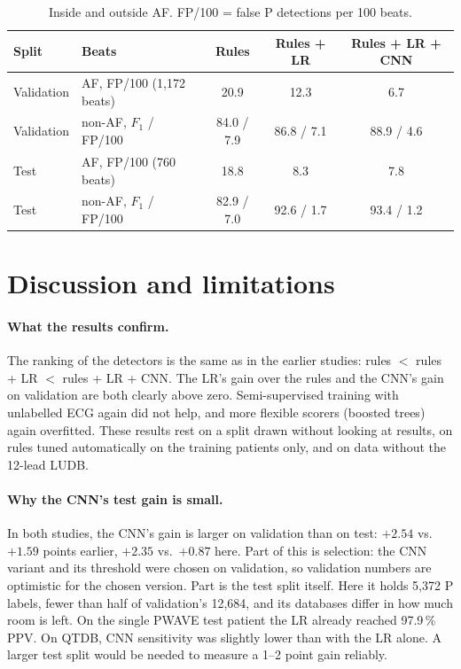 \documentclass[11pt,a4paper]{article}
\begin{document}
\begin{table}[ht]
\centering
\caption{Inside and outside AF. FP/100 = false P detections per 100 beats.}
\label{tab:af}
\begin{tabular}{llccc}
\toprule
Split & Beats & Rules & Rules + LR & Rules + LR + CNN \\
\midrule
Validation & AF, FP/100 (1,172 beats) & 20.9 & 12.3 & 6.7 \\
Validation & non-AF, $F_1$ / FP/100 & 84.0 / 7.9 & 86.8 / 7.1 & 88.9 / 4.6 \\
Test & AF, FP/100 (760 beats) & 18.8 & 8.3 & 7.8 \\
Test & non-AF, $F_1$ / FP/100 & 82.9 / 7.0 & 92.6 / 1.7 & 93.4 / 1.2 \\
\bottomrule
\end{tabular}
\end{table}

\section{Discussion and limitations}

\paragraph{What the results confirm.} The ranking of the detectors is the same as in the earlier studies: rules $<$ rules + LR $<$ rules + LR + CNN. The LR's gain over the rules and the CNN's gain on validation are both clearly above zero. Semi-supervised training with unlabelled ECG again did not help, and more flexible scorers (boosted trees) again overfitted. These results rest on a split drawn without looking at results, on rules tuned automatically on the training patients only, and on data without the 12-lead LUDB.

\paragraph{Why the CNN's test gain is small.} In both studies, the CNN's gain is larger on validation than on test: $+2.54$ vs.\ $+1.59$ points earlier, $+2.35$ vs.\ $+0.87$ here. Part of this is selection: the CNN variant and its threshold were chosen on validation, so validation numbers are optimistic for the chosen version. Part is the test split itself. Here it holds 5,372 P labels, fewer than half of validation's 12,684, and its databases differ in how much room is left. On the single PWAVE test patient the LR already reached 97.9\,\% PPV. On QTDB, CNN sensitivity was slightly lower than with the LR alone. A larger test split would be needed to measure a 1--2 point gain reliably.
\end{document}
